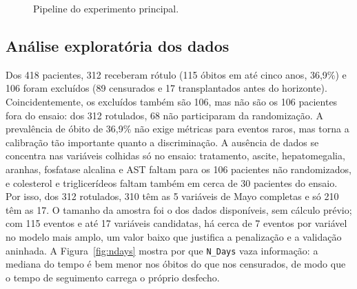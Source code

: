 \begin{figure}[htbp]
\centering
{}
\caption{Pipeline do experimento principal.}
\label{fig:pipeline}
\par{}
\end{figure}

\subsection{Análise exploratória dos dados}
Dos 418 pacientes, 312 receberam rótulo (115 óbitos em até cinco anos, 36,9\%) e 106 foram excluídos (89 censurados e 17 transplantados antes do horizonte). Coincidentemente, os excluídos também são 106, mas não são os 106 pacientes fora do ensaio: dos 312 rotulados, 68 não participaram da randomização. A prevalência de óbito de 36,9\% não exige métricas para eventos raros, mas torna a calibração tão importante quanto a discriminação. A ausência de dados se concentra nas variáveis colhidas só no ensaio: tratamento, ascite, hepatomegalia, aranhas, fosfatase alcalina e AST faltam para os 106 pacientes não randomizados, e colesterol e triglicerídeos faltam também em cerca de 30 pacientes do ensaio. Por isso, dos 312 rotulados, 310 têm as 5 variáveis de Mayo completas e só 210 têm as 17. O tamanho da amostra foi o dos dados disponíveis, sem cálculo prévio; com 115 eventos e até 17 variáveis candidatas, há cerca de 7 eventos por variável no modelo mais amplo, um valor baixo que justifica a penalização e a validação aninhada. A Figura~\ref{fig:ndays} mostra por que \texttt{N\_Days} vaza informação: a mediana do tempo é bem menor nos óbitos do que nos censurados, de modo que o tempo de seguimento carrega o próprio desfecho.

